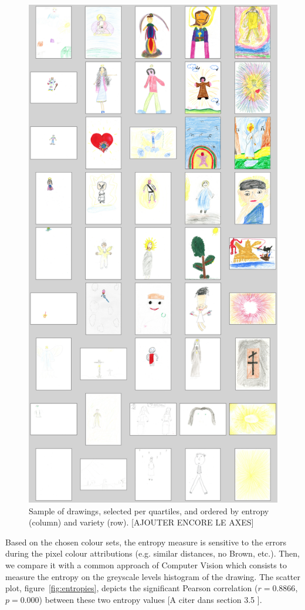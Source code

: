 \documentclass[11pt,a4paper]{article}
\begin{document}
\begin{figure}[h!]
	\centering
	\includegraphics[width=0.8\linewidth]{figures/colors-grille.png}
	\caption{Sample of drawings, selected per quartiles, and ordered by entropy (column) and variety (row). {\color{red}[AJOUTER ENCORE LE AXES]}}
	\label{fig:grille}
\end{figure}

Based on the chosen colour sets, the entropy measure is sensitive to the errors during the pixel colour attributions (e.g. similar distances, no Brown, etc.). 
Then, we compare it with a common approach of Computer Vision which consists to measure the entropy on the greyscale levels histogram of the drawing. 
The scatter plot, figure~\ref{fig:entropies}, depicts the significant Pearson correlation ($r=0.8866$, $p=0.000$) between these two entropy values {\color{red}[A citer dans section 3.5 \citet{wu2013}]}. 
\end{document}
